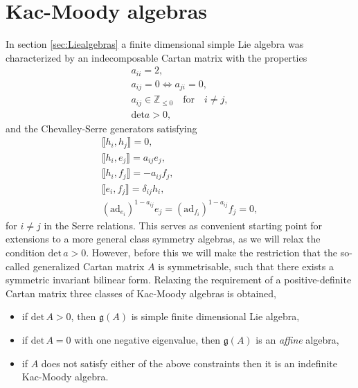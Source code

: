 \section{Kac-Moody algebras}\label{sec:KacMoody}
In section \ref{sec:Liealgebras} a finite dimensional simple Lie algebra was characterized by an indecomposable Cartan matrix with the properties 
\begin{equation}
    \begin{aligned}
        a_{ii} = 2,\\
        a_{ij} = 0 \Longleftrightarrow a_{ji} = 0,\\
        a_{ij}\in \mathbb{Z}_{\leq 0} \quad\text{for}\quad i\neq j,\\
        \text{det}a >0,
    \end{aligned}
\end{equation}
and the Chevalley-Serre generators satisfying 
\begin{equation}
\begin{aligned}\label{eq:ChevalleySerre2}
    \llbracket h_i,h_j\rrbracket = 0,\\
    \llbracket h_i,e_j\rrbracket = a_{ij}e_{j},\\
    \llbracket h_i,f_j\rrbracket = -a_{ij}f_{j},\\
    \llbracket e_i,f_j\rrbracket = \delta_{ij}h_i,\\
    (\text{ad}_{e_i})^{1-a_{ij}}e_j = (\text{ad}_{f_i})^{1-a_{ij}}f_j = 0,
\end{aligned}
\end{equation}
for $i\neq j$ in the Serre relations. This serves as convenient starting point for extensions to a more general class symmetry algebras, as we will relax the condition $\text{det}\,a>0$. However, before this we will make the restriction that the so-called generalized Cartan matrix $A$ is symmetrisable, such that there exists a symmetric invariant bilinear form. Relaxing the requirement of a positive-definite Cartan matrix three classes of Kac-Moody algebras is obtained,
\begin{itemize}
    \item if $\text{det}\,A >0$, then $\mathfrak{g}(A)$ is simple finite dimensional Lie algebra,
    \item if $\text{det}\,A =0$ with one negative eigenvalue, then $\mathfrak{g}(A)$ is an \emph{affine} algebra,  
    \item if $A$ does not satisfy either of the above constraints then it is an indefinite Kac-Moody algebra.
\end{itemize}

